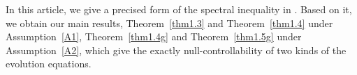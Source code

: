 \documentclass{article}
\numberwithin{equation}{section}
\newcommand\R{\ensuremath{\mathbb{R}}}
\newtheorem{theorem}{Theorem}[section]
\numberwithin{equation}{section}
\theoremstyle{definition}
\begin{document}


In this article, we give a precised form of the spectral inequality in \cite[Theorem~1]{zhu2023spectral}. Based on it, we obtain our main results, Theorem~\ref{thm1.3} and Theorem~\ref{thm1.4} under Assumption~\ref{A1}, Theorem~\ref{thm1.4g} and Theorem~\ref{thm1.5g} under Assumption~\ref{A2}, which give the exactly null-controllability of two kinds of the evolution equations.
\end{document}

